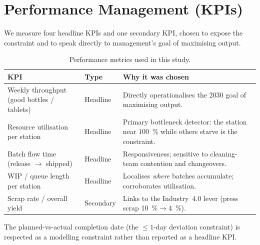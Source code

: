 \section{Performance Management (KPIs)}
\label{sec:kpi}

We measure four headline KPIs and one secondary KPI, chosen to expose the
constraint and to speak directly to management's goal of maximising output.

\begin{table}[H]
\centering
\caption{Performance metrics used in this study.}
\label{tab:kpis}
\begin{tabularx}{\textwidth}{l l X}
\toprule
\textbf{KPI} & \textbf{Type} & \textbf{Why it was chosen} \\
\midrule
Weekly throughput (good bottles / tablets) & Headline & Directly operationalises the 2030 goal of maximising output. \\
Resource utilisation per station & Headline & Primary bottleneck detector: the station near \SI{100}{\percent} while others starve is the constraint. \\
Batch flow time (release $\rightarrow$ shipped) & Headline & Responsiveness; sensitive to cleaning-team contention and changeovers. \\
WIP / queue length per station & Headline & Localises \emph{where} batches accumulate; corroborates utilisation. \\
Scrap rate / overall yield & Secondary & Links to the Industry~4.0 lever (press scrap \SI{10}{\percent}$\rightarrow$\SI{4}{\percent}). \\
\bottomrule
\end{tabularx}
\end{table}

The planned-vs-actual completion date (the $\le 1$-day deviation constraint) is
respected as a modelling constraint rather than reported as a headline KPI.
